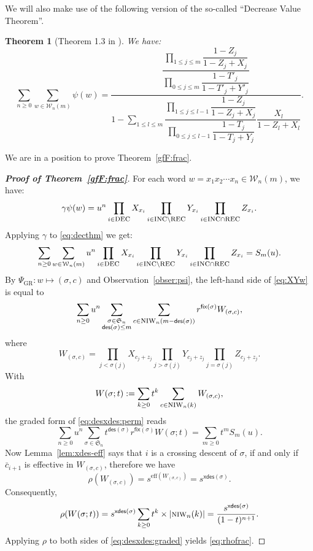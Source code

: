 \documentclass[12pt]{amsart} %
\numberwithin{equation}{section}
\theoremstyle{plain}
\newtheorem{theorem}{Theorem}[section]
\theoremstyle{definition}
\def\xdes{\mathsf{xdes}}
\def\DEC{\hbox{\rm\textsc{dec}}}
\def\INC{\hbox{\rm\textsc{inc}}}
\def\REC{\hbox{\rm\textsc{rec}}}
\def\NIW{\hbox{\rm\textsc{niw}}}
\def\fix{\mathsf{fix}}
\def\des{\mathsf{des}}
\def\S{\mathfrak{S}}
\def\W{\mathcal{W}}
\def\eff{\mathrm{eff}}
\begin{document}
We will also make use of the following version of the so-called ``Decrease Value Theorem''.
\begin{theorem}[Theorem 1.3 in \cite{fh}]
We have:
\begin{equation}\label{eq:decthm}
\sum_{n\ge 0}\sum_{w\in\W_n(m)} \psi(w)
=\dfrac{\dfrac{\prod\limits_{1\le j\le m}\dfrac{1-Z_j}{1-Z_j+X_j}}{\prod\limits_{0\le j\le m}\dfrac{1-T'_j}{1-T'_j+Y'_j}}}
{1-\sum\limits_{1\le l\le m}\dfrac{\prod\limits_{1\le j\le l-1}\dfrac{1-Z_j}{1-Z_j+X_j}}{\prod\limits_{0\le j\le l-1}\dfrac{1-T_j}{1-T_j+Y_j}}\dfrac{X_l}{1-Z_l+X_l}}.
\end{equation}
\end{theorem}
We are in a position to prove Theorem~\ref{gfF:frac}.
\begin{proof}[{\bf Proof of Theorem~\ref{gfF:frac}}]
	For each word $w=x_1x_2\cdots x_n \in \W_n(m)$,
	we have:
	\begin{equation}\label{eq:gammapsiw}
		\gamma\psi(w)= 
			{\displaystyle	u^n \prod_{i\in \DEC} {X_{x_i}} \prod_{i\in \INC\setminus\REC} {Y_{x_i}} \prod_{i\in \INC \cap \REC} {Z_{x_i}} }.
	\end{equation}
	Applying $\gamma$ to \eqref{eq:decthm} we get:
	\begin{equation}\label{eq:XYw}
		\sum_{n\ge 0}\sum_{w\in\W_n(m)} u^n \prod_{i\in \DEC} {X_{x_i}} \prod_{i\in \INC\setminus\REC} {Y_{x_i}} \prod_{i\in \INC \cap \REC} {Z_{x_i}}  = 
		S_m(u).
	\end{equation}
	By $\Psi_{\mathrm{GR}}: w\mapsto (\sigma, c)$ and Observation~\ref{obser:psi}, the left-hand side of \eqref{eq:XYw} is equal to
	\begin{equation}\label{eq:desxdes:perm}
		\sum_{n\ge 0} u^n \sum_{\substack{\sigma \in \S_n \\ \des(\sigma)\leq m}}   
		\sum_{c\in \NIW_n(m-\des(\sigma))} r^{\fix(\sigma)} W_{(\sigma,c)},
	\end{equation}
	where 
	$$
	W_{(\sigma,c)} = \prod_{j<\sigma(j)} X_{c_j+z_j} \prod_{j>\sigma(j)} Y_{c_j+z_j} \prod_{j=\sigma(j)} Z_{c_j+z_j}.
	$$
	With
	$$
	W(\sigma;t) := \sum_{k\geq 0} t^k \sum_{c \in \NIW_n(k)} W_{(\sigma,c)},
	$$
	the graded form of \eqref{eq:desxdes:perm} reads
	\begin{equation}\label{eq:desxdes:graded}
		\sum_{n\geq 0} u^n \sum_{\sigma \in \S_n}   t^{\des(\sigma)} r^{\fix(\sigma)}W(\sigma;t)
		= \sum_{m\geq 0} t^m S_m(u).
	\end{equation}
	Now Lemma~\ref{lem:xdes-eff} says that $i$ is a crossing descent of $\sigma$, if and only if $\bar c_{i+1}$ is effective in $W_{(\sigma,c)}$, therefore we have
	\begin{equation}\label{eq:rhoY}	
	\rho(W_{(\sigma, c)})= s^{\eff(W_{(\sigma, c)})} = s^{\xdes(\sigma)}.
	\end{equation}	
    Consequently,
	$$
	\rho(W(\sigma;t))= s^{\xdes(\sigma)}  \sum_{k\geq 0} t^k\times |\NIW_n(k)|
	=\frac{s^{\xdes(\sigma)} }{(1-t)^{n+1}}.
	$$
	Applying $\rho$ to both sides of \eqref{eq:desxdes:graded} yields \eqref{eq:rhofrac}.
\end{proof}
\end{document}
